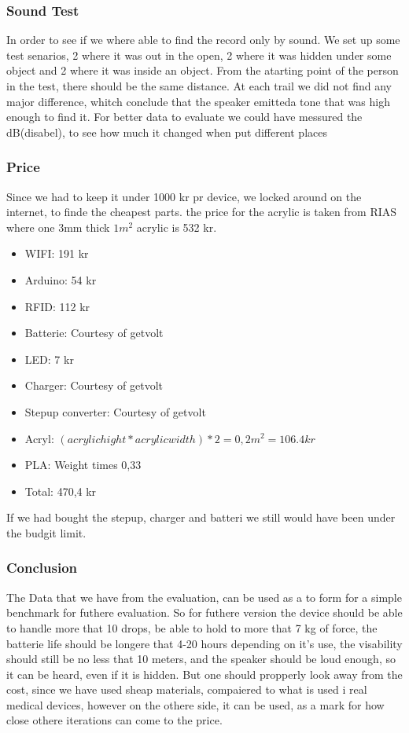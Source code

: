 \subsubsection{Sound Test}
In order to see if we where able to find the record only by sound.
We set up some test senarios, 2 where it was out in the open, 2 where it was hidden under some object and 2 where it was inside an object. From the atarting point of the person in the test, there should be the same distance.
At each trail we did not find any major difference, whitch conclude that the speaker emitteda tone that was high enough to find it.
For better data to evaluate we could have messured the dB(disabel), to see how much it changed when put different places

\subsubsection{Price}
Since we had to keep it under 1000 kr pr device, we locked around on the internet, to finde the cheapest parts.
the price for the acrylic is taken from RIAS \cite{RIAS} where one 3mm thick $1 m^2$ acrylic is 532 kr.
\begin{itemize} \itemsep0em
	 \item WIFI: 191 kr \cite{Adafruit}
	 \item Arduino: 54 kr \cite{Sparkfun}
	 \item RFID: 112 kr \cite{Let-Eletronik}
	 \item Batterie: Courtesy of getvolt  \cite{Getvolt}
	 \item LED: 7 kr \cite{Adafruit}
	 \item Charger: Courtesy of getvolt \cite{Getvolt}
	 \item Stepup converter: Courtesy of getvolt  \cite{Getvolt}
	 \item Acryl: $(acrylic hight * acrylic width)*2 = 0,2 m^2 = 106.4 kr $ \cite{RIAS}
	 \item PLA: Weight times 0,33 
	 \item Total: 470,4 kr
\end{itemize}
If we had bought the stepup, charger and batteri we still would have been under the budgit limit.

\subsubsection{Conclusion}
The Data that we have from the evaluation, can be used as a to form for a simple benchmark for futhere evaluation.
So for futhere version the device should be able to handle more that 10 drops, be able to hold to more that 7 kg of force, the batterie life should be longere that 4-20 hours depending on it's use, the visability should still be no less that 10 meters, and the speaker should be loud enough, so it can be heard, even if it is hidden.
But one should propperly look away from the cost, since we have used sheap materials, compaiered to what is used i real medical devices, however on the othere side, it can be used, as a mark for how close othere iterations can come to the price.